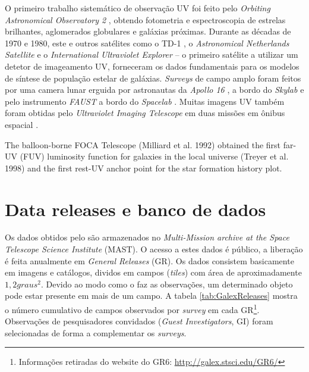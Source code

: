 O primeiro trabalho sistemático de observação UV foi feito pelo {\em Orbiting
Astronomical Observatory 2} \citep{Code1970}, obtendo fotometria e
espectroscopia de estrelas brilhantes, aglomerados globulares e galáxias
próximas. Durante as décadas de 1970 e 1980, este e outros satélites como o TD-1
\citep{Boksenberg1973}, o {\em Astronomical Netherlands Satellite}
\citep{vanDuinen1975} e o {\em International Ultraviolet Explorer}
\citep{Kondo1987} -- o primeiro satélite a utilizar um detetor de imageamento
UV, forneceram os dados fundamentais para os modelos de síntese de população
estelar de galáxias. {\em Surveys} de campo amplo foram feitos por uma camera
lunar erguida por astronautas da {\em Apollo 16} \citep{Carruthers1973}, a bordo
do {\em Skylab} \citep{Henize1975} e pelo instrumento {\em FAUST} a bordo do
{\em Spacelab} \citep{Bowyer1993}. Muitas imagens UV também foram obtidas pelo
{\em Ultraviolet Imaging Telescope} em duas missões em ônibus espacial
\citep{Stecher1997}.

The balloon-borne FOCA Telescope (Milliard et al. 1992) obtained the
first far- UV (FUV) luminosity function for galaxies in the local universe
(Treyer et al. 1998) and the first rest-UV anchor point for the star formation
history plot.



\section{Data releases e banco de dados}
\label{sec:Galex:BancoDeDados}

Os dados obtidos pelo \galex{} são armazenados no {\em Multi-Mission archive at
the Space Telescope Science Institute} (MAST). O acesso a estes dados é público,
a liberação é feita anualmente em {\em General Releases} (GR). Os dados
consistem basicamente em imagens e catálogos, dividos em campos ({\em tiles})
com área de aproximadamente $1,2graus^2$. Devido ao modo como o \galex{} faz as
observações, um determinado objeto pode estar presente em mais de um campo. A
tabela \ref{tab:GalexReleases} mostra o número cumulativo de campos observados
por {\em survey} em cada GR\footnote{Informações retiradas do website do GR6:
\url{http://galex.stsci.edu/GR6/}}. Observações de pesquisadores convidados
({\em Guest Investigators}, GI) foram selecionadas de forma a complementar os
{\em surveys}.

